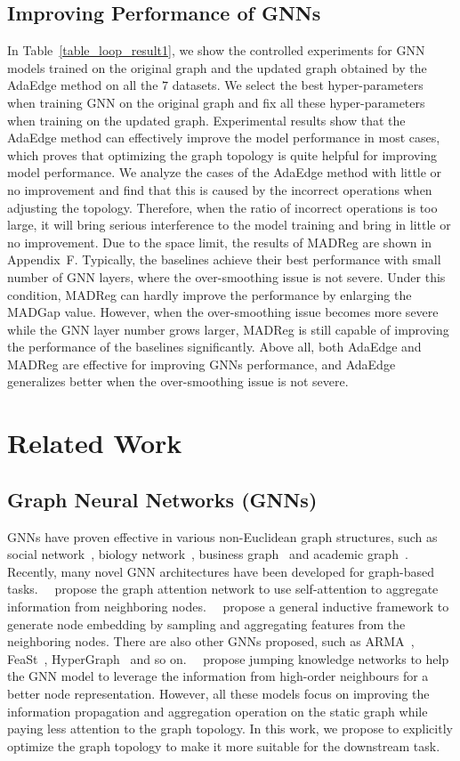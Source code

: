 \documentclass[letterpaper]{article} \usepackage{aaai20}  \usepackage{times}  \usepackage{helvet} \usepackage{courier}  \usepackage[hyphens]{url}  \usepackage{graphicx} \urlstyle{rm} \def\UrlFont{\rm}  \frenchspacing  \setlength{\pdfpagewidth}{8.5in}  \setlength{\pdfpageheight}{11in}  \setcounter{secnumdepth}{0}
\newcommand{\citet}[1]{\citeauthor{#1}~\shortcite{#1}}
\newcommand{\citep}{\cite}
\begin{document}
\subsection{Improving Performance of GNNs}
In Table~\ref{table_loop_result1}, we show the controlled experiments for GNN models trained on the original graph and the updated graph obtained by the AdaEdge method on all the $7$ datasets. We select the best hyper-parameters when training GNN on the original graph and fix all these hyper-parameters when training on the updated graph. Experimental results show that the AdaEdge method can effectively improve the model performance in most cases, which proves that optimizing the graph topology is quite helpful for improving model performance. 
We analyze the cases of the AdaEdge method with little or no improvement and find that this is caused by the incorrect operations when adjusting the topology. 
Therefore, when the ratio of incorrect operations is too large, it will bring serious interference to the model training and bring in little or no improvement.
Due to the space limit, the results of MADReg are shown in Appendix~F. 
Typically, the baselines achieve their best performance with small number of GNN layers, where the over-smoothing issue is not severe. Under this condition, MADReg can hardly improve the performance by enlarging the MADGap value. However, when the over-smoothing issue becomes more severe while the GNN layer number grows larger, MADReg is still capable of improving the performance of the baselines significantly.
Above all, both AdaEdge and MADReg are effective for improving GNNs performance, and AdaEdge generalizes better when the over-smoothing issue is not severe.

\section{Related Work}
\subsection{Graph Neural Networks (GNNs)}
GNNs have proven effective in various non-Euclidean graph structures, such as social network~\citep{model_sage}, biology network~\citep{dataset_ppi}, business graph~\citep{dataset_real_amazon} and academic graph~\citep{dataset_real_ccp}. 
Recently, many novel GNN architectures have been developed for graph-based tasks.~\citet{model_gat} propose the graph attention network to use self-attention to aggregate information from neighboring nodes.~\citet{model_sage} propose a general inductive framework to generate node embedding by sampling and aggregating features from the neighboring nodes. There are also other GNNs proposed, such as ARMA~\citep{model_arma}, FeaSt~\citep{model_feast}, HyperGraph~\citep{model_hyper_graph} and so on.~\citet{jump_knowledge} propose jumping knowledge networks to help the GNN model to leverage the information from high-order neighbours for a better node representation.
However, all these models focus on improving the information propagation and aggregation operation on the static graph while paying less attention to the graph topology. 
In this work, we propose to explicitly optimize the graph topology to make it more suitable for the downstream task.
\end{document}
